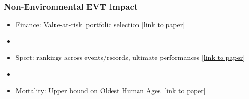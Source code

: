 \begin{frame}
\frametitle{Non-Environmental EVT Impact}
\begin{itemize}
\item Finance: Value-at-risk, portfolio selection \href{https://www.tandfonline.com/doi/abs/10.1080/10920277.1999.10595797}{[link to paper]}
\item []
\item Sport: rankings across events/records, ultimate performances \href{https://www.tandfonline.com/doi/abs/10.1198/016214508000000698}{[link to paper]}
\item []
\item Mortality: Upper bound on Oldest Human Ages \href{https://royalsocietypublishing.org/doi/full/10.1098/rsos.202097}{[link to paper]}
\end{itemize}
\end{frame} 



